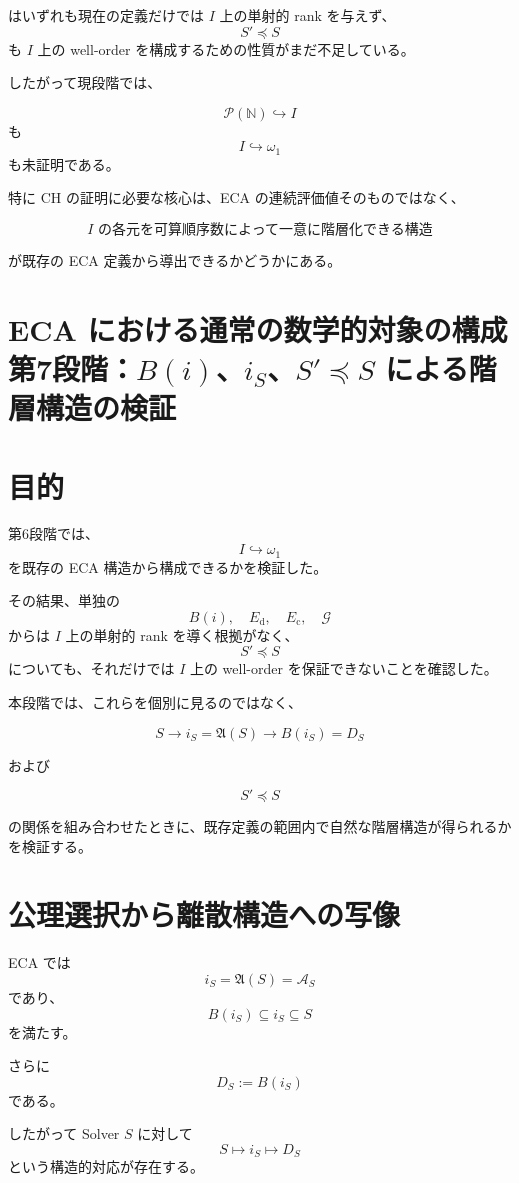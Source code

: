 \documentclass[a4paper,11pt]{article}
\begin{document}
はいずれも現在の定義だけでは $I$ 上の単射的 rank を与えず、
\[
S'\preceq S
\]
も $I$ 上の well-order を構成するための性質がまだ不足している。

したがって現段階では、

\[
\boxed{
\mathcal{P}(\mathbb{N})\hookrightarrow I
}
\]
も
\[
\boxed{
I\hookrightarrow\omega_1
}
\]
も未証明である。

特に CH の証明に必要な核心は、ECA の連続評価値そのものではなく、

\[
\boxed{
\text{$I$ の各元を可算順序数によって一意に階層化できる構造}
}
\]

が既存の ECA 定義から導出できるかどうかにある。


\section{ECA における通常の数学的対象の構成 \large{第7段階：$B(i)$、$i_S$、$S'\preceq S$ による階層構造の検証}}

\section{目的}

第6段階では、
\[
I\hookrightarrow\omega_1
\]
を既存の ECA 構造から構成できるかを検証した。

その結果、単独の
\[
B(i),\quad E_{\mathrm{d}},\quad E_{\mathrm{c}},\quad\mathcal G
\]
からは $I$ 上の単射的 rank を導く根拠がなく、
\[
S'\preceq S
\]
についても、それだけでは $I$ 上の well-order を保証できないことを確認した。

本段階では、これらを個別に見るのではなく、

\[
S
\longrightarrow
i_S=\mathfrak A(S)
\longrightarrow
B(i_S)=D_S
\]

および

\[
S'\preceq S
\]

の関係を組み合わせたときに、既存定義の範囲内で自然な階層構造が得られるかを検証する。

\section{公理選択から離散構造への写像}

ECA では
\[
i_S=\mathfrak A(S)=\mathcal{A}_S
\]
であり、
\[
B(i_S)\subseteq i_S\subseteq S
\]
を満たす。

さらに
\[
D_S:=B(i_S)
\]
である。

したがって Solver $S$ に対して
\[
S
\longmapsto
i_S
\longmapsto
D_S
\]
という構造的対応が存在する。
\end{document}
